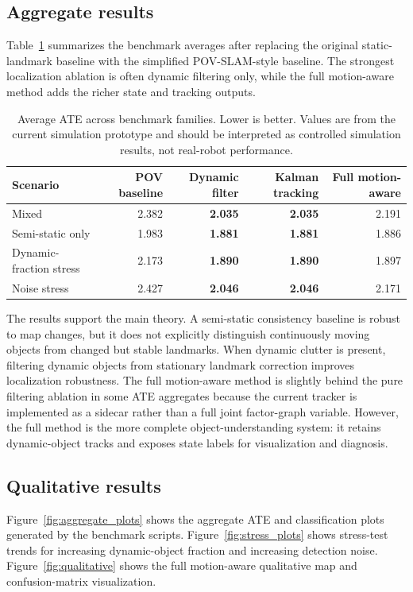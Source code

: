 ﻿\documentclass[11pt]{article}
\begin{document}
\subsection{Aggregate results}
Table~\ref{tab:aggregate_ate} summarizes the benchmark averages after replacing the original static-landmark baseline with the simplified POV-SLAM-style baseline. The strongest localization ablation is often dynamic filtering only, while the full motion-aware method adds the richer state and tracking outputs.

\begin{table}[t]
\centering
\caption{Average ATE across benchmark families. Lower is better. Values are from the current simulation prototype and should be interpreted as controlled simulation results, not real-robot performance.}
\label{tab:aggregate_ate}
\begin{tabular}{lrrrr}
\toprule
Scenario & POV baseline & Dynamic filter & Kalman tracking & Full motion-aware \\
\midrule
Mixed & 2.382 & \textbf{2.035} & \textbf{2.035} & 2.191 \\
Semi-static only & 1.983 & \textbf{1.881} & \textbf{1.881} & 1.886 \\
Dynamic-fraction stress & 2.173 & \textbf{1.890} & \textbf{1.890} & 1.897 \\
Noise stress & 2.427 & \textbf{2.046} & \textbf{2.046} & 2.171 \\
\bottomrule
\end{tabular}
\end{table}

The results support the main theory. A semi-static consistency baseline is robust to map changes, but it does not explicitly distinguish continuously moving objects from changed but stable landmarks. When dynamic clutter is present, filtering dynamic objects from stationary landmark correction improves localization robustness. The full motion-aware method is slightly behind the pure filtering ablation in some ATE aggregates because the current tracker is implemented as a sidecar rather than a full joint factor-graph variable. However, the full method is the more complete object-understanding system: it retains dynamic-object tracks and exposes state labels for visualization and diagnosis.

\subsection{Qualitative results}
Figure~\ref{fig:aggregate_plots} shows the aggregate ATE and classification plots generated by the benchmark scripts. Figure~\ref{fig:stress_plots} shows stress-test trends for increasing dynamic-object fraction and increasing detection noise. Figure~\ref{fig:qualitative} shows the full motion-aware qualitative map and confusion-matrix visualization.
\end{document}
